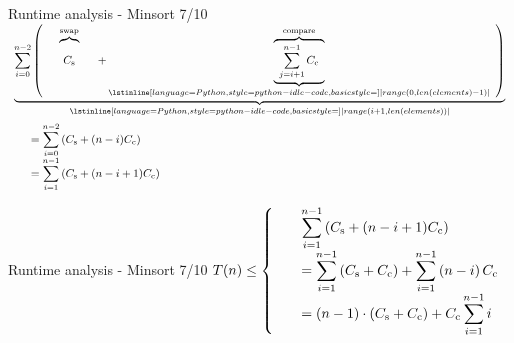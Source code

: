 \begin{frame}{Runtime analysis - Minsort 7/10}
  \centering
  $\begin{array}{l}
    \displaystyle
      \underbrace{
        \sum^{n - 2}_{i = 0}
          \left(
            \hspace*{1.5em}
            \overbrace{
              C_\text{s}
              \vphantom{
                \sum^{n - 1}_{j = i + 1}
              }
            }^\text{swap}
            \hspace*{1.5em} +
            \underbrace{
              \overbrace{
                \hspace*{0.5em}
                \sum^{n - 1}_{j = i + 1} C_\text{c}
                \hspace*{0.5em}
              }^\text{compare}
            }_{
              \lstinline[
                language=Python,
                style={python-idle-code},
                basicstyle=\small
              ]|range(0, len(elements)-1)|
            }
          \hspace*{0.5em}
          \right)
        }_{
          \lstinline[
            language=Python,
            style={python-idle-code},
            basicstyle=\small
          ]|range(i+1, len(elements))|
        }\\[5em]
    \displaystyle\hspace*{1.5em}
      = \sum^{n - 2}_{i = 0} \left(C_\text{s} + (n - i) C_\text{c}\right)\\
    \displaystyle\hspace*{1.5em}
      = \sum^{n - 1}_{i = 1} \left(C_\text{s} + (n - i + 1) C_\text{c}\right)
  \end{array}$
\end{frame}


\begin{frame}{Runtime analysis - Minsort 7/10}
  \centering
  $T(n) \leq
  \left\lbrace
  \begin{array}{l}
  \displaystyle\hspace*{1.5em}
    \sum^{n - 1}_{i = 1} \left(C_\text{s} + (n - i + 1) C_\text{c}\right)\\
  \displaystyle\hspace*{1.5em}
    = \sum^{n - 1}_{i = 1} \left(C_\text{s} + C_\text{c}\right)
    + \sum^{n - 1}_{i = 1} \left(n - i\right) C_\text{c}\\
  \displaystyle\hspace{1.5em}
    = \left(n - 1\right) \cdot \left(C_\text{s} + C_\text{c}\right)
    + C_\text{c} \sum_{i = 1}^{n - 1} i\\
  \end{array}
  \right.
  $
\end{frame}

